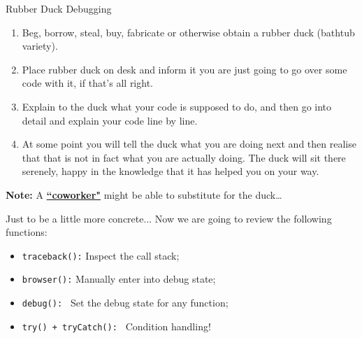 \documentclass[
hyperref={bookmarks=false},
xcolor={dvipsnames,svgnames*,x11names*}, 
12pt
]{beamer}
\begin{document}
\begin{frame}{Rubber Duck Debugging}
\vspace{-0.5cm}
{\small
\begin{enumerate}
\item Beg, borrow, steal, buy, fabricate or otherwise obtain a rubber duck (bathtub variety).
\item Place rubber duck on desk and inform it you are just going to go over some code with it, if that’s all right.
\item Explain to the duck what your code is supposed to do, and then go into detail and explain your code line by line.
\item At some point you will tell the duck what you are doing next and then realise that that is not in fact what you are actually doing. The duck will sit there serenely, happy in the knowledge that it has helped you on your way.
\end{enumerate}
}

\textbf{Note:} A \href{https://sites.google.com/unimib.it/camerlenghi-federico/}{\textbf{``coworker"}} might be able to substitute for the duck\dots
\end{frame}

\begin{frame}{Just to be a little more concrete...}
\vspace{-0.5cm}
Now we are going to review the following functions: 
\begin{itemize}
\itemsep 3ex
\item \texttt{traceback():} Inspect the call stack;
\item \texttt{browser():} Manually enter into debug state;
\item \texttt{debug(): } Set the debug state for any function;
\item \texttt{try() + tryCatch(): } Condition handling! 
\end{itemize}
\end{frame}
\end{document}
